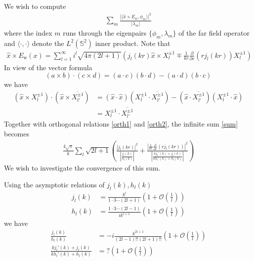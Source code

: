 We wish to compute
\begin{align}\label{sum}
  \sum_m\frac{|\langle\hat{x}\times E_w, \phi_m\rangle|^2}{|\lambda_m|}
\end{align}
where the index $m$ runs through the eigenpairs $\{\phi_m, \lambda_m\}$ of the far field operator and $\langle\cdot,\cdot\rangle$ denote the $L^2(\mathbb{S}^2)$ inner product. Note that
\begin{align}
  \hat{x}\times E_\text{w}(x) = \sum_{l=1}^\infty i^l\sqrt{4\pi(2l+1)}\left(j_l(kr)\hat{x}\times X_l^{\pm 1}\mp\frac{1}{k r}\frac{\partial}{\partial r}(r j_l(kr))X_l^{\pm 1}\right)
\end{align}
In view of the vector formula $$(a\times b)\cdot(c\times d)=(a\cdot c)(b\cdot d)-(a\cdot d)(b\cdot c)$$ we have
\begin{align}
  (\hat{x}\times X_l^{\pm 1})\cdot (\hat{x}\times\overline{X_{l'}^{\pm 1}}) &= (\hat{x}\cdot\hat{x})(X_l^{\pm 1}\cdot\overline{X_{l'}^{\pm 1}}) - (\hat{x}\cdot\overline{X_{l'}^{\pm 1}})(X_l^{\pm 1}\cdot\hat{x}) \\
  &= X_l^{\pm 1}\cdot\overline{X_{l'}^{\pm 1}}
\end{align}
Together with orthogonal relations \eqref{orth1} and \eqref{orth2}, the infinite sum \eqref{sum} becomes
\begin{align}
  \frac{4\sqrt\pi}{k}\sum_l \sqrt{2l+1}\left(\frac{|j_l(kr)|^2}{\left|\frac{j_l(k)}{h_l(k)}\right|} + \frac{|\frac{1}{k r}\frac{\partial}{\partial r}(r j_l(kr))|^2}{\left|\frac{kj_l'(k)+j_l(k)}{kh_l'(k)+h_l(k)}\right|}\right)
\end{align}
We wish to investigate the convergence of this sum.

Using the asymptotic relations of $j_l(k), h_l(k)$
\begin{align}
  j_l(k) &= \frac{k^l}{1\cdot 3\cdots(2l+1)}\left(1 + \mathcal{O}\left(\frac{1}{l}\right)\right) \\
  h_l(k) &= \frac{1\cdot 3\cdots(2l-1)}{ik^{l+1}}\left(1 + \mathcal{O}\left(\frac{1}{l}\right)\right) 
\end{align}
we have
\begin{align}
  \frac{j_l(k)}{h_l(k)} &= -i\frac{k^{2l+1}}{(2l-1)!!(2l+1)!!}\left(1 + \mathcal{O}\left(\frac{1}{l}\right)\right) \\
  \frac{kj_l'(k)+j_l(k)}{kh_l'(k)+h_l(k)} &= ?\left(1 + \mathcal{O}\left(\frac{1}{l}\right)\right)
\end{align}

\nocite{*}




